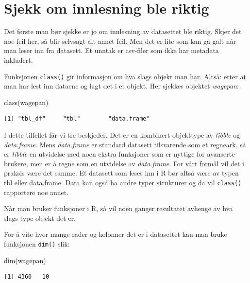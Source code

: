 \documentclass[
  norsk,
  letterpaper,
  DIV=11,
  numbers=noendperiod]{scrreprt}
\newenvironment{Shaded}{\begin{snugshade}}{\end{snugshade}}
\newcommand{\FunctionTok}[1]{\textcolor[rgb]{0.28,0.35,0.67}{#1}}
\newcommand{\NormalTok}[1]{\textcolor[rgb]{0.00,0.23,0.31}{#1}}
\theoremstyle{definition}
\theoremstyle{remark}
\begin{document}
\section{Sjekk om innlesning ble
riktig}\label{sjekk-om-innlesning-ble-riktig}

Det første man bør sjekke er jo om innlesning av datasettet ble riktig.
Skjer det noe feil her, så blir selvsagt alt annet feil. Men det er lite
som kan gå galt når man leser inn fra datasett. Et unntak er csv-filer
som ikke har metadata inkludert.

Funksjonen \texttt{class()} gir informasjon om hva slags objekt man har.
Altså: etter at man har lest inn dataene og lagt det i et objekt. Her
sjekkes objektet \emph{wagepan}:

\begin{Shaded}
\begin{Highlighting}[]
\FunctionTok{class}\NormalTok{(wagepan)}
\end{Highlighting}
\end{Shaded}

\begin{verbatim}
[1] "tbl_df"     "tbl"        "data.frame"
\end{verbatim}

I dette tilfellet får vi tre beskjeder. Det er en kombinert objekttype
av \emph{tibble} og \emph{data.frame}. Mens \emph{data.frame} er
standard datasett tilsvarende som et regneark, så er \emph{tibble} en
utvidelse med noen ekstra funksjoner som er nyttige for avanserte
brukere, men er å regne som en utvidelse av \emph{data.frame}. For vårt
formål vil det i praksis være det samme. Et datasett som leses inn i R
bør altså være av typen tbl eller data.frame. Data kan også ha andre
typer strukturer og da vil \texttt{class()} rapportere noe annet.

Når man bruker funksjoner i R, så vil noen ganger resultatet avhenge av
hva slags type objekt det er.

For å vite hvor mange rader og kolonner det er i datasettet kan man
bruke funksjonen \texttt{dim()} slik:

\begin{Shaded}
\begin{Highlighting}[]
\FunctionTok{dim}\NormalTok{(wagepan)}
\end{Highlighting}
\end{Shaded}

\begin{verbatim}
[1] 4360   10
\end{verbatim}
\end{document}
